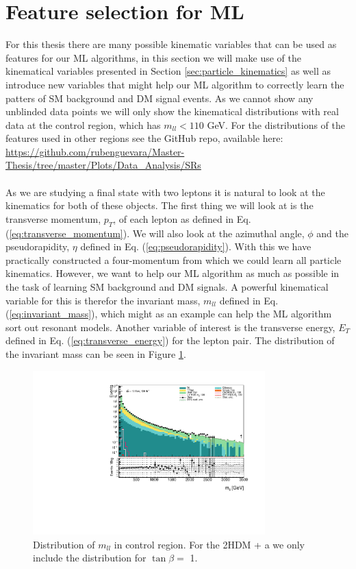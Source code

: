 \documentclass[12pt, a4paper]{book}
\begin{document}
\section{Feature selection for ML}
For this thesis there are many possible kinematic variables that can be used as features for our ML algorithms, in this section we will make use of the kinematical variables presented in Section \ref{sec:particle_kinematics} as well as introduce new variables that 
might help our ML algorithm to correctly learn the patters of SM background and DM signal events. As we cannot show any unblinded data points we will only show the kinematical distributions with real data at the control region, which has $m_{ll}<110$ GeV. For the 
distributions of the features used in other regions see the GitHub repo, available here: \href{https://github.com/rubenguevara/Master-Thesis/tree/master/Plots/Data_Analysis/SRs}{https://github.com/rubenguevara/Master-Thesis/tree/master/Plots/Data\_Analysis/SRs} \\
\\As we are studying a final state with two leptons it is natural to look at the kinematics for both of these objects. The first thing we will look at is the transverse momentum, $p_T$, of each lepton as defined in Eq. (\ref{eq:transverse_momentum}). 
We will also look at the azimuthal angle, $\phi$ and the pseudorapidity, $\eta$ defined in Eq. (\ref{eq:pseudorapidity}). 
With this we have practically constructed a four-momentum from which we could learn all particle kinematics. However, we want to help our ML algorithm as much as possible in the task of learning SM background and DM signals. A powerful kinematical variable for this is 
therefor the invariant mass, $m_{ll}$ defined in Eq. (\ref{eq:invariant_mass}), which might as an example can help the ML algorithm sort out resonant models. Another variable of interest is the transverse energy, $E_T$ defined in Eq. (\ref{eq:transverse_energy}) for the lepton pair. 
The distribution of the invariant mass can be seen in Figure \ref{fig:mll_dist}.\\
\graphicspath{{../../../Plots/Data_Analysis/SRs/Control_region/}} 
\begin{figure}[!ht]
    \centering
        \includegraphics[width=0.8\textwidth]{mll.pdf}
    \caption{Distribution of $m_{ll}$ in control region.  For the 2HDM + a we only include the distribution for $\tan\beta=$ 1.}\label{fig:mll_dist}
\end{figure}
\end{document}
